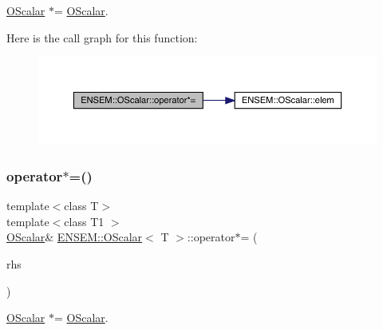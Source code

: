\mbox{\hyperlink{classENSEM_1_1OScalar}{O\+Scalar}} $\ast$= \mbox{\hyperlink{classENSEM_1_1OScalar}{O\+Scalar}}. 

Here is the call graph for this function\+:
\nopagebreak
\begin{figure}[H]
\begin{center}
\leavevmode
\includegraphics[width=350pt]{da/d80/classENSEM_1_1OScalar_a9977cd15ef5da689d65713ddf0768085_cgraph}
\end{center}
\end{figure}
\mbox{\label{classENSEM_1_1OScalar_a9977cd15ef5da689d65713ddf0768085}} 
\subsubsection{\texorpdfstring{operator$\ast$=()}{operator*=()}\hspace{0.1cm}{\footnotesize\ttfamily [2/2]}}
{\footnotesize\ttfamily template$<$class T$>$ \\
template$<$class T1 $>$ \\
\mbox{\hyperlink{classENSEM_1_1OScalar}{O\+Scalar}}\& \mbox{\hyperlink{classENSEM_1_1OScalar}{E\+N\+S\+E\+M\+::\+O\+Scalar}}$<$ T $>$\+::operator$\ast$= (\begin{DoxyParamCaption}\item[{const \mbox{\hyperlink{classENSEM_1_1OScalar}{O\+Scalar}}$<$ T1 $>$ \&}]{rhs }\end{DoxyParamCaption})\hspace{0.3cm}{\ttfamily [inline]}}



\mbox{\hyperlink{classENSEM_1_1OScalar}{O\+Scalar}} $\ast$= \mbox{\hyperlink{classENSEM_1_1OScalar}{O\+Scalar}}. 

